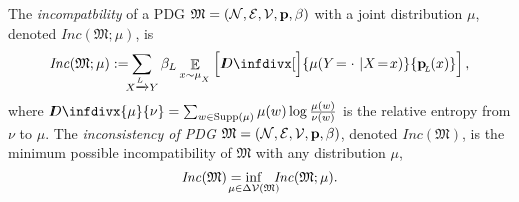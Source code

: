 \documentclass{article}
\theoremstyle{plain}
\theoremstyle{definition}
\theoremstyle{remark}
\newcommand{\thickD}{I\mkern-8muD}
\newcommand{\kldiv}{\thickD\infdivx}%
\newcommand\mat[1]{\mathbf{#1}}
\def\sheq{\!=\!}
\newcommand{\bmu}{\boldsymbol{\mu}}
\newcommand{\bp}[1][L]{\mat{p}_{\!_{#1}\!}}
\newcommand{\V}{\mathcal V}
\newcommand{\dg}[1]{\mathfrak{#1}}
\newcommand\inco{\mathit{Inc}}
\newcommand{\ed}[3]{#2 \xrightarrow{\!\!\smash{#1}\vphantom{g}} #3}
\newcommand{\alle}[1][L]{_{ \ed {#1}XY}}
\numberwithin{equation}{section}
\begin{document}
	\begin{defn}\label{def:zeta-score}
	       	The \emph{incompatbility} of a PDG $\dg M = \mnvars[]$ with
		a joint distribution $\mu$,	
          denoted $\inco(\dg M;\mu)$, is  
	  \[
			\inco(\dg M ; \mu) := %
			\!\!\!\sum
				\alle
						\beta_L
                        \mathop{\mathbb E}_{x \sim \mu_{_X}}
                        \left[\kldiv[\Big]{ \mu(Y\!= \cdot\ | X \sheq
                                                        x) }{\bp(x) } \right] ,
		\]
		where $\kldiv{\mu}{\nu} = \sum_{w \in \text{Supp($\mu$)}} \mu(w) \log\frac{\mu(w)}{\nu(w)}$ is the 
		relative
		entropy from $\nu$ to $\mu$.
        The \emph{inconsistency of PDG $\dg M = \mnvars[]$},
                denoted $\inco(\dg M)$, is the
        minimum possible incompatibility of $\dg M$ with any distribution $\mu$, 
		\[ \inco(\dg M) = \inf_{\mathclap{\mu \in \Delta \V(\dg M)}}
                ~~\inco (\dg M; \mu) . \]
        \end{defn}
\end{document}
